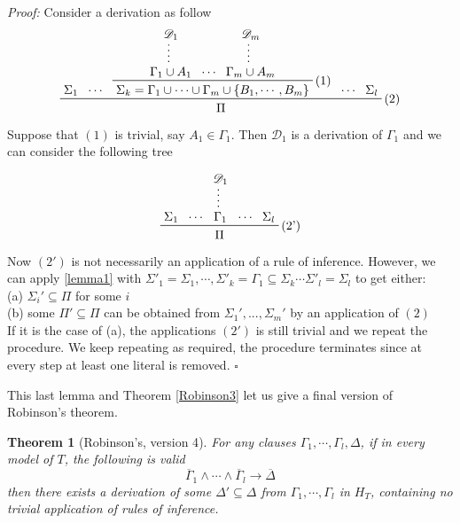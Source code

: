 \documentclass[a4paper,12pt,oneside]{book}
\newtheorem{theorem}{Theorem}[chapter]
\newcommand{\D}{\mathscr{D}}
\newcommand*{\QED}{\hfill\ensuremath{\square}}
\let\e\wedge
\begin{document}
\textit{Proof:} Consider a derivation as follow
\begin{equation*}
\prftree[r]{(2)}{\prfassumption{\Sigma_1}}{\cdots}
{ \prftree[r]{(1)}{ \prfsummary{\D_1}{\Gamma_1\cup A_1} } {\cdots } { \prfsummary{\D_m}{\Gamma_m\cup A_m}} {\Sigma_k=\Gamma_1\cup\cdots\cup\Gamma_m\cup\{B_1,\cdots,B_m\}} }
{\cdots}{\prfassumption{\Sigma_l}}{\Pi}
\end{equation*}
Suppose that $(1)$ is trivial, say $A_1\in\Gamma_1$. Then $\D_1$ is a derivation of $\Gamma_1$ and we can consider the following tree

\begin{equation*}
\prftree[r]{(2')}{\prfassumption{\Sigma_1}}{\cdots}
{\prfsummary{\D_1}{\Gamma_1}}
{\cdots}{\prfassumption{\Sigma_l}}{\Pi}
\end{equation*}
Now $(2')$ is not necessarily an application of a rule of inference. However, we can apply \ref{lemma1} with  $\Sigma'_1=\Sigma_1,\cdots, \Sigma'_k=\Gamma_1\subseteq\Sigma_k\cdots\Sigma'_l=\Sigma_l$ to get either:\\
(a) $\Sigma_i' \subseteq \Pi$ for some $i$\\
(b) some $\Pi '\subseteq\Pi$ can be obtained from $\Sigma_1 ',...,\Sigma_m '$ by an application of $(2)$\\
If it is the case of (a), the applications $(2')$ is still trivial and we repeat the procedure. We keep repeating as required, the procedure terminates since at every step at least one literal is removed. \QED



\noindent This last lemma and Theorem \ref{Robinson3}  let us give a final version of Robinson's theorem.
\begin{theorem}[{Robinson's, version 4}] \label{Robinson}
For any clauses $\Gamma_1, \cdots ,\Gamma_l , \Delta$, if in every model of $T$, the following is valid 
$$
\overline{\Gamma}_1\e\cdots\e\overline{\Gamma}_l \rightarrow \overline{\Delta}
$$
then there exists a derivation of some $\Delta' \subseteq \Delta$ from $\Gamma_1, \cdots ,\Gamma_l$ in $H_T$, containing no trivial application of rules of inference.
\end{theorem}
\end{document}
